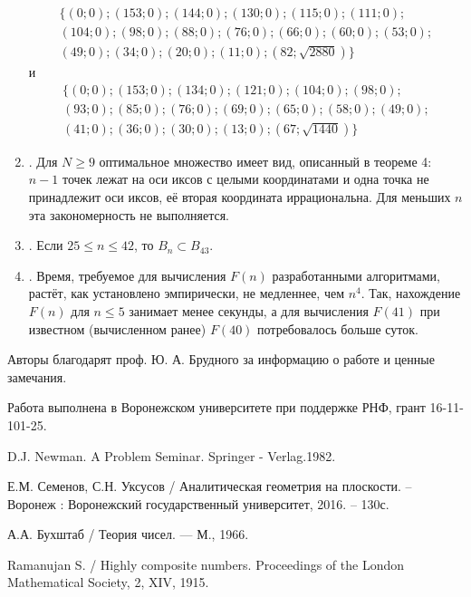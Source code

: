 \documentclass[a4paper,14pt]{article} %
\begin{document}
\begin{enumerate}
\begin{multline*}
\{( 0 ; 0 ); ( 153 ; 0 ); ( 144 ; 0 ); ( 130 ; 0 ); ( 115 ; 0 ); ( 111 ; 0 );\\
( 104 ; 0 ); ( 98 ; 0 ); ( 88 ; 0 ); ( 76 ; 0 ); ( 66 ; 0 ); ( 60 ; 0 ); ( 53 ; 0 );\\
( 49 ; 0 ); ( 34 ; 0 ); ( 20 ; 0 ); ( 11 ; 0 ); ( 82 ; \sqrt{2880})\}
\end{multline*}
и
\begin{multline*}
\{( 0 ; 0 ); ( 153 ; 0 ); ( 134 ; 0 ); ( 121 ; 0 ); ( 104 ; 0 ); ( 98 ; 0 );\\
( 93 ; 0 ); ( 85 ; 0 ); ( 76 ; 0 ); ( 69 ; 0 ); ( 65 ; 0 ); ( 58 ; 0 ); ( 49 ; 0 );\\
( 41 ; 0 ); ( 36 ; 0 ); ( 30 ; 0 ); ( 13 ; 0 ); ( 67 ; \sqrt{1440} )\}
\end{multline*}

\item.
Для $N \geq 9$ оптимальное множество имеет вид, описанный в теореме 4:
$n-1$ точек лежат на оси иксов с целыми координатами и одна точка не принадлежит оси иксов, её вторая координата иррациональна.
Для меньших $n$ эта закономерность не выполняется.

\item.
Если $ 25 \leq n \leq 42$, то $B_n \subset B_{43}$.

\item.
Время, требуемое для вычисления $F(n)$ разработанными алгоритмами, растёт, как установлено эмпирически, не медленнее, чем $n^4$.
Так, нахождение $F(n)$ для $n \leq 5$ занимает менее секунды, а для вычисления $F(41)$ при известном (вычисленном ранее) $F(40)$ потребовалось больше суток.

\end{enumerate}

Авторы благодарят проф. Ю. А. Брудного за информацию о работе \cite{Newman} и ценные замечания.

Работа выполнена в Воронежском университете при поддержке РНФ, грант 16-11-101-25.

\newpage

\begin{thebibliography}{99}

 D.J. Newman. A Problem Seminar. Springer - Verlag.1982.

 Е.М. Семенов, С.Н. Уксусов / Аналитическая геометрия на плоскости. – Воронеж : Воронежский государственный университет, 2016. – 130с.

 А.А. Бухштаб / Теория чисел. --- М., 1966.

 Ramanujan S. / Highly composite numbers. Proceedings of the London Mathematical Society, 2, XIV, 1915.

\end{thebibliography}
\end{document}
